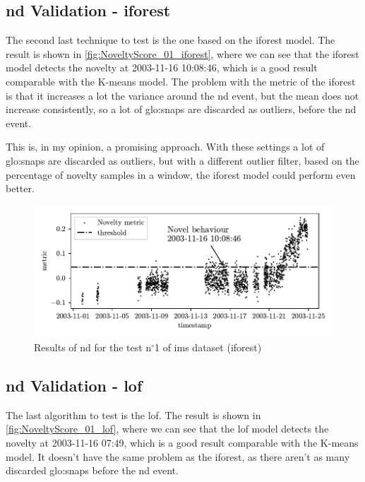 \subsection{\gls{nd} Validation - \gls{iforest}}
The second last technique to test is the one based on the \gls{iforest} model. The result is shown in \autoref{fig:NoveltyScore_01_iforest}, where we can see that the \gls{iforest} model detects the novelty at 2003-11-16 10:08:46, which is a good result comparable with the K-means model. The problem with the metric of the \gls{iforest} is that it increases a lot the variance around the \gls{nd} event, but the mean does not increase consistently, so a lot of \gls{glo:snap}s are discarded as outliers, before the \gls{nd} event. 

This is, in my opinion, a promising approach. With these settings a lot of \gls{glo:snap}s are discarded as outliers, but with a different outlier filter, based on the percentage of novelty samples in a window, the \gls{iforest} model could perform even better.
\begin{figure}
    \centering
    \includegraphics{images/IMS/Novelty_01_500samples_bearing3x_iforest.pdf}
    \caption{Results of \gls{nd} for the test $\text{n}^\circ$1 of \gls{ims} dataset (\gls{iforest})}
    \label{fig:NoveltyScore_01_iforest}
\end{figure}

\subsection{\gls{nd} Validation - \gls{lof}}
The last algorithm to test is the \gls{lof}. The result is shown in \autoref{fig:NoveltyScore_01_lof}, where we can see that the \gls{lof} model detects the novelty at 2003-11-16 07:49, which is a good result comparable with the K-means model. It doesn't have the same problem as the \gls{iforest}, as there aren't as many discarded \gls{glo:snap}s before the \gls{nd} event.

